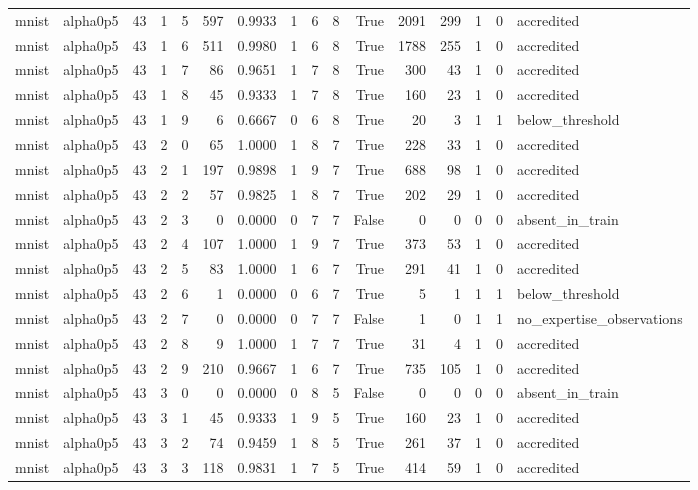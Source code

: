 \begin{tabular}{llrrrrrrrrrrrrrl}
mnist & alpha0p5 & 43 & 1 & 5 & 597 & 0.9933 & 1 & 6 & 8 & True & 2091 & 299 & 1 & 0 & accredited \\
mnist & alpha0p5 & 43 & 1 & 6 & 511 & 0.9980 & 1 & 6 & 8 & True & 1788 & 255 & 1 & 0 & accredited \\
mnist & alpha0p5 & 43 & 1 & 7 & 86 & 0.9651 & 1 & 7 & 8 & True & 300 & 43 & 1 & 0 & accredited \\
mnist & alpha0p5 & 43 & 1 & 8 & 45 & 0.9333 & 1 & 7 & 8 & True & 160 & 23 & 1 & 0 & accredited \\
mnist & alpha0p5 & 43 & 1 & 9 & 6 & 0.6667 & 0 & 6 & 8 & True & 20 & 3 & 1 & 1 & below\_threshold \\
mnist & alpha0p5 & 43 & 2 & 0 & 65 & 1.0000 & 1 & 8 & 7 & True & 228 & 33 & 1 & 0 & accredited \\
mnist & alpha0p5 & 43 & 2 & 1 & 197 & 0.9898 & 1 & 9 & 7 & True & 688 & 98 & 1 & 0 & accredited \\
mnist & alpha0p5 & 43 & 2 & 2 & 57 & 0.9825 & 1 & 8 & 7 & True & 202 & 29 & 1 & 0 & accredited \\
mnist & alpha0p5 & 43 & 2 & 3 & 0 & 0.0000 & 0 & 7 & 7 & False & 0 & 0 & 0 & 0 & absent\_in\_train \\
mnist & alpha0p5 & 43 & 2 & 4 & 107 & 1.0000 & 1 & 9 & 7 & True & 373 & 53 & 1 & 0 & accredited \\
mnist & alpha0p5 & 43 & 2 & 5 & 83 & 1.0000 & 1 & 6 & 7 & True & 291 & 41 & 1 & 0 & accredited \\
mnist & alpha0p5 & 43 & 2 & 6 & 1 & 0.0000 & 0 & 6 & 7 & True & 5 & 1 & 1 & 1 & below\_threshold \\
mnist & alpha0p5 & 43 & 2 & 7 & 0 & 0.0000 & 0 & 7 & 7 & False & 1 & 0 & 1 & 1 & no\_expertise\_observations \\
mnist & alpha0p5 & 43 & 2 & 8 & 9 & 1.0000 & 1 & 7 & 7 & True & 31 & 4 & 1 & 0 & accredited \\
mnist & alpha0p5 & 43 & 2 & 9 & 210 & 0.9667 & 1 & 6 & 7 & True & 735 & 105 & 1 & 0 & accredited \\
mnist & alpha0p5 & 43 & 3 & 0 & 0 & 0.0000 & 0 & 8 & 5 & False & 0 & 0 & 0 & 0 & absent\_in\_train \\
mnist & alpha0p5 & 43 & 3 & 1 & 45 & 0.9333 & 1 & 9 & 5 & True & 160 & 23 & 1 & 0 & accredited \\
mnist & alpha0p5 & 43 & 3 & 2 & 74 & 0.9459 & 1 & 8 & 5 & True & 261 & 37 & 1 & 0 & accredited \\
mnist & alpha0p5 & 43 & 3 & 3 & 118 & 0.9831 & 1 & 7 & 5 & True & 414 & 59 & 1 & 0 & accredited \\

\end{tabular}
